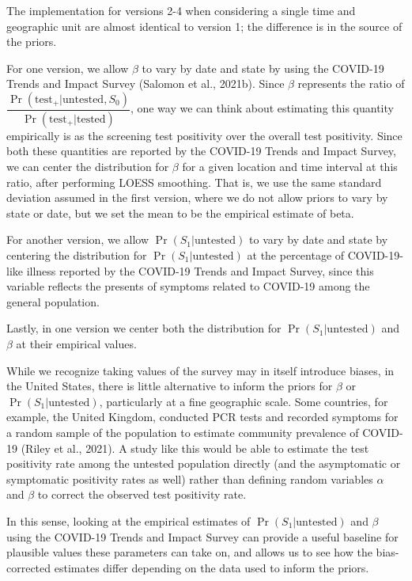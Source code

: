\documentclass[12pt,twoside]{smiththesis}
\begin{document}
The implementation for versions 2-4 when considering a single time and geographic unit are almost identical to version 1; the difference is in the source of the priors.

For one version, we allow \(\beta\) to vary by date and state by using the COVID-19 Trends and Impact Survey (Salomon et al., 2021b). Since \(\beta\) represents the ratio of \(\dfrac{\Pr(\text{test}_+|\text{untested},S_0)}{\Pr(\text{test}_+|\text{tested})}\), one way we can think about estimating this quantity empirically is as the screening test positivity over the overall test positivity. Since both these quantities are reported by the COVID-19 Trends and Impact Survey, we can center the distribution for \(\beta\) for a given location and time interval at this ratio, after performing LOESS smoothing. That is, we use the same standard deviation assumed in the first version, where we do not allow priors to vary by state or date, but we set the mean to be the empirical estimate of beta.

For another version, we allow \(\Pr(S_1|\text{untested})\) to vary by date and state by centering the distribution for \(\Pr(S_1|\text{untested})\) at the percentage of COVID-19-like illness reported by the COVID-19 Trends and Impact Survey, since this variable reflects the presents of symptoms related to COVID-19 among the general population.

Lastly, in one version we center both the distribution for \(\Pr(S_1|\text{untested})\) and \(\beta\) at their empirical values.

While we recognize taking values of the survey may in itself introduce biases, in the United States, there is little alternative to inform the priors for \(\beta\) or \(\Pr(S_1|\text{untested})\), particularly at a fine geographic scale. Some countries, for example, the United Kingdom, conducted PCR tests and recorded symptoms for a random sample of the population to estimate community prevalence of COVID-19 (Riley et al., 2021). A study like this would be able to estimate the test positivity rate among the untested population directly (and the asymptomatic or symptomatic positivity rates as well) rather than defining random variables \(\alpha\) and \(\beta\) to correct the observed test positivity rate.

In this sense, looking at the empirical estimates of \(\Pr(S_1|\text{untested})\) and \(\beta\) using the COVID-19 Trends and Impact Survey can provide a useful baseline for plausible values these parameters can take on, and allows us to see how the bias-corrected estimates differ depending on the data used to inform the priors.
\end{document}
